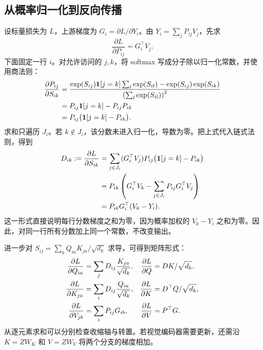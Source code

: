 \subsection{从概率归一化到反向传播}
设标量损失为 $L$，上游梯度为 $G_i=\partial L/\partial Y_i$。由 $Y_i=\sum_jP_{ij}V_j$，先求
\begin{equation}\label{eq:att_probability_gradient}
 \frac{\partial L}{\partial P_{ij}}=G_i^\top V_j.
\end{equation}
下面固定一行 $i$。对允许访问的 $j,k$，将 softmax 写成分子除以归一化常数，并使用商法则：
\begin{align}\label{eq:softmax_jacobian}
 \frac{\partial P_{ij}}{\partial S_{ik}}
 &=\frac{\exp(S_{ij})\mathbf1[j=k]\sum_l\exp(S_{il})
       -\exp(S_{ij})\exp(S_{ik})}
       {\left(\sum_l\exp(S_{il})\right)^2}\notag\\
 &=P_{ij}\mathbf1[j=k]-P_{ij}P_{ik}\notag\\
 &=P_{ij}\bigl(\mathbf1[j=k]-P_{ik}\bigr).
\end{align}
求和只遍历 $J_i$。若 $k\notin J_i$，该分数未进入归一化，导数为零。把上式代入链式法则，得到
\begin{align}\label{eq:att_score_gradient}
 D_{ik}:=\frac{\partial L}{\partial S_{ik}}
 &=\sum_{j\in J_i}(G_i^\top V_j)P_{ij}
       \bigl(\mathbf1[j=k]-P_{ik}\bigr)\notag\\
 &=P_{ik}\left(G_i^\top V_k-\sum_{j\in J_i}P_{ij}G_i^\top V_j\right)\notag\\
 &=P_{ik}G_i^\top(V_k-Y_i).
\end{align}
这一形式直接说明每行分数梯度之和为零，因为概率加权的 $V_k-Y_i$ 之和为零。因此，对同一行所有分数加上同一个常数，不改变输出。

进一步对 $S_{ij}=\sum_aQ_{ia}K_{ja}/\sqrt{d_k}$ 求导，可得到矩阵形式：
\begin{align}\label{eq:att_tensor_gradient}
 \frac{\partial L}{\partial Q_{ia}}
 &=\sum_jD_{ij}\frac{K_{ja}}{\sqrt{d_k}},
 &\frac{\partial L}{\partial Q}&=DK/\sqrt{d_k},\notag\\
 \frac{\partial L}{\partial K_{ja}}
 &=\sum_iD_{ij}\frac{Q_{ia}}{\sqrt{d_k}},
 &\frac{\partial L}{\partial K}&=D^\top Q/\sqrt{d_k},\notag\\
 \frac{\partial L}{\partial V_{jb}}
 &=\sum_iP_{ij}G_{ib},
 &\frac{\partial L}{\partial V}&=P^\top G.
\end{align}
从逐元素求和可以分别检查收缩轴与转置。若视觉编码器需要更新，还需沿 $K=ZW_K$ 和 $V=ZW_V$ 将两个分支的梯度相加。

